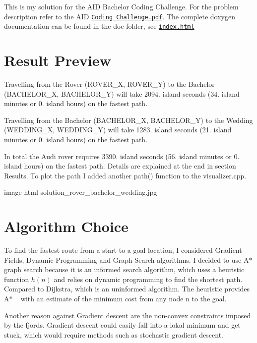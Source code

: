 This is my solution for the A\+ID Bachelor Coding Challenge. For the problem description refer to the A\+ID \href{../../AID Coding Challenge.pdf}{\tt Coding Challenge.\+pdf}. The complete doxygen documentation can be found in the doc folder, see \href{../../doc/html/index.html}{\tt index.\+html}

\section*{Result Preview}

Travelling from the Rover (R\+O\+V\+E\+R\+\_\+X, R\+O\+V\+E\+R\+\_\+Y) to the Bachelor (B\+A\+C\+H\+E\+L\+O\+R\+\_\+X, B\+A\+C\+H\+E\+L\+O\+R\+\_\+Y) will take 2094. island seconds (34. island minutes or 0. island hours) on the fastest path.

Travelling from the Bachelor (B\+A\+C\+H\+E\+L\+O\+R\+\_\+X, B\+A\+C\+H\+E\+L\+O\+R\+\_\+Y) to the Wedding (W\+E\+D\+D\+I\+N\+G\+\_\+X, W\+E\+D\+D\+I\+N\+G\+\_\+Y) will take 1283. island seconds (21. island minutes or 0. island hours) on the fastest path.

In total the Audi rover requires 3390. island seconds (56. island minutes or 0. island hours) on the fastest path. Details are explained at the end in section Results. To plot the path I added another path() function to the visualizer.\+cpp.

image html solution\+\_\+rover\+\_\+bachelor\+\_\+wedding.\+jpg



\section*{Algorithm Choice}

To find the fastest route from a start to a goal location, I considered Gradient Fields, Dynamic Programming and Graph Search algorithms. I decided to use A$\ast$ graph search because it is an informed search algorithm, which uses a heuristic function $h(n)$ and relies on dynamic programming to find the shortest path. Compared to Dijkstra, which is an uninformed algorithm. The heuristic provides A$\ast$ ~\newline
 with an estimate of the minimum cost from any node n to the goal.

Another reason against Gradient descent are the non-\/convex constraints imposed by the fjords. Gradient descent could easily fall into a lokal minimum and get stuck, which would require methods such as stochastic gradient descent.

